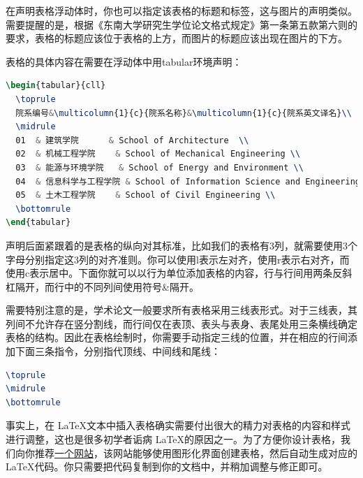 \noindent 在声明表格浮动体时，你也可以指定该表格的标题和标签，这与图片的声明类似。需要提醒的是，根据《东南大学研究生学位论文格式规定》\cite{seugs2015rule}第一条第五款第六则的要求，表格的标题应该位于表格的上方，而图片的标题应该出现在图片的下方。

表格的具体内容在需要在浮动体中用{\codefont tabular}环境声明：

\begin{tcolorbox}
\begin{lstlisting}[language=TeX]
\begin{tabular}{cll}
  \toprule
  院系编号&\multicolumn{1}{c}{院系名称}&\multicolumn{1}{c}{院系英文译名}\\
  \midrule
  01  & 建筑学院      & School of Architecture  \\
  02  & 机械工程学院    & School of Mechanical Engineering \\
  03  & 能源与环境学院   & School of Energy and Environment \\
  04  & 信息科学与工程学院 & School of Information Science and Engineering \\
  05  & 土木工程学院    & School of Civil Engineering \\
  \bottomrule
\end{tabular}
\end{lstlisting}
\end{tcolorbox}

声明后面紧跟着的是表格的纵向对其标准，比如我们的表格有3列，就需要使用3个字母分别指定这3列的对齐准则。你可以使用{\codefont l}表示左对齐，使用{\codefont r}表示右对齐，而使用{\codefont c}表示居中。下面你就可以以行为单位添加表格的内容，行与行间用两条反斜杠隔开，而行中的不同列间使用符号\&隔开。

需要特别注意的是，学术论文一般要求所有表格采用三线表形式。对于三线表，其列间不允许存在竖分割线，而行间仅在表顶、表头与表身、表尾处用三条横线确定表格的结构。因此在表格绘制时，你需要手动指定三线的位置，并在相应的行间添加下面三条指令，分别指代顶线、中间线和尾线：

\begin{tcolorbox}
\begin{lstlisting}[language=TeX]
\toprule
\midrule
\bottomrule
\end{lstlisting}
\end{tcolorbox}

事实上，在 \LaTeX 文本中插入表格确实需要付出很大的精力对表格的内容和样式进行调整，这也是很多初学者诟病 \LaTeX 的原因之一。为了方便你设计表格，我们向你推荐\href{http://www.tablesgenerator.com/}{一个网站}，该网站能够使用图形化界面创建表格，然后自动生成对应的 \LaTeX 代码。你只需要把代码复制到你的文档中，并稍加调整与修正即可。

